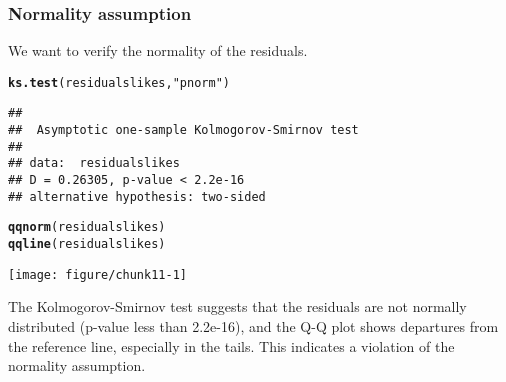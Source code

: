 \documentclass[11pt]{article}\usepackage[]{graphicx}\usepackage[]{xcolor}
\makeatletter
\newcommand{\hlsng}[1]{\textcolor[rgb]{0.192,0.494,0.8}{#1}}%
\newcommand{\hldef}[1]{\textcolor[rgb]{0.345,0.345,0.345}{#1}}%
\newcommand{\hlkwd}[1]{\textcolor[rgb]{0.737,0.353,0.396}{\textbf{#1}}}%
\newenvironment{kframe}{%
 \def\at@end@of@kframe{}%
 \ifinner\ifhmode%
  \def\at@end@of@kframe{\end{minipage}}%
  \begin{minipage}{\columnwidth}%
 \fi\fi%
 \def\FrameCommand##1{\hskip\@totalleftmargin \hskip-\fboxsep
 \colorbox{shadecolor}{##1}\hskip-\fboxsep
     \hskip-\linewidth \hskip-\@totalleftmargin \hskip\columnwidth}%
 \MakeFramed {\advance\hsize-\width
   \@totalleftmargin\z@ \linewidth\hsize
   \@setminipage}}%
 {\par\unskip\endMakeFramed%
 \at@end@of@kframe}
\newenvironment{knitrout}{}{} %
\makeatother
\begin{document}
\subsubsection{Normality assumption}
We want to verify the normality of the residuals.
\begin{knitrout}
\color{fgcolor}\begin{kframe}
\begin{alltt}
\hlkwd{ks.test}\hldef{(residualslikes ,}\hlsng{"pnorm"}\hldef{)}
\end{alltt}
\begin{verbatim}
## 
## 	Asymptotic one-sample Kolmogorov-Smirnov test
## 
## data:  residualslikes
## D = 0.26305, p-value < 2.2e-16
## alternative hypothesis: two-sided
\end{verbatim}
\begin{alltt}
\hlkwd{qqnorm}\hldef{(residualslikes)}
\hlkwd{qqline}\hldef{(residualslikes)}
\end{alltt}
\end{kframe}

{\centering \texttt{[image: figure/chunk11-1]} 

}


\end{knitrout}
The Kolmogorov-Smirnov test suggests that the residuals are not normally distributed (p-value less than 2.2e-16), and the Q-Q plot shows departures from the reference line, especially in the tails. This indicates a violation of the normality assumption.
\end{document}
